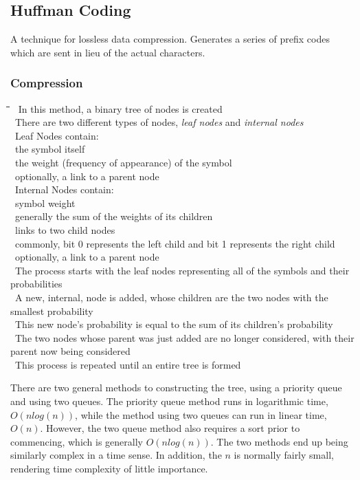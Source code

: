 \documentclass[10pt,letterpaper]{scrartcl}
\newcommand{\tbul}{\textbullet}
\newcommand{\tend}{\>\textendash}
\newcommand{\tasc}{\>\>\textasteriskcentered}
\newcommand{\tabDef}{\hspace{2em}\=\hspace{2em}\=\hspace{2em}\=\hspace{2em}\=\kill}
\begin{document}
\subsection{Huffman Coding}
A technique for lossless data compression. Generates a series of prefix codes which are sent in lieu of the actual characters. 
\subsubsection{Compression}
\begin{tabbing}\tabDef 
\tbul\ In this method, a binary tree of nodes is created \\
\tbul\ There are two different types of nodes, \textit{leaf nodes} and \textit{internal nodes} \\
\tbul\ Leaf Nodes contain: \\
	\tend\ the symbol itself \\
    \tend\ the weight (frequency of appearance) of the symbol \\
    \tend\ optionally, a link to a parent node \\
\tbul\ Internal Nodes contain: \\
	\tend\ symbol weight \\
        \tasc\ generally the sum of the weights of its children \\
    \tend\ links to two child nodes \\
    	\tasc\ commonly, bit 0 represents the left child and bit 1 represents the right child \\
    \tend\ optionally, a link to a parent node \\
\tbul\ The process starts with the leaf nodes representing all of the symbols and their probabilities \\
\tbul\ A new, internal, node is added, whose children are the two nodes with the smallest probability \\
\tbul\ This new node's probability is equal to the sum of its children's probability \\ 
\tbul\ The two nodes whose parent was just added are no longer considered, with their parent now being considered \\
\tbul\ This process is repeated until an entire tree is formed
\end{tabbing}
There are two general methods to constructing the tree, using a priority queue and using two queues. The priority queue method runs in logarithmic time, $O(nlog(n))$, while the method using two queues can run in linear time, $O(n)$. However, the two queue method also requires a sort prior to commencing, which is generally $O(nlog(n))$. The two methods end up being similarly complex in a time sense. In addition, the $n$ is normally fairly small, rendering time complexity of little importance. 
\end{document}
